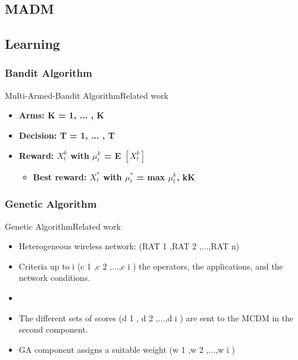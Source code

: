 \subsection{MADM}




\subsection{Learning}

\subsubsection{Bandit Algorithm}

\begin{frame}{Multi-Armed-Bandit Algorithm}{Related work}
\begin{itemize}
	\item \bf{Arms:} K = {1, ... , K}
	\item \bf{Decision:} T = {1, ... , T}
	\item \bf{Reward:} $X^{k}_{t}$ with $\mu^{k}_{t}$ = E $[X^{k}_{t}]$
	\begin{itemize}
		\item \bf{Best reward:} $X^{*}_{t}$ with $\mu^{*}_{t}$ = max $\mu^{k}_{t}$,  k\in  K
	\end{itemize}
\end{itemize}
\end{frame}

\subsubsection{Genetic Algorithm}

\begin{frame}{Genetic Algorithm}{Related work \cite{alkhawlani_access_2008a}}
\begin{itemize}
	\item Heterogeneous wireless network: (RAT 1 ,RAT 2 ,...,RAT n)
	\item Criteria up to i (c 1 ,c 2 ,...,c i ) the operators, the applications, and the network conditions.
	\item 
	\item The different sets of scores (d 1 , d 2 ,...,d i ) are sent to the MCDM in the second component.
	\item GA component assigns a suitable weight (w 1 ,w 2 ,...,w i )
\end{itemize}
\end{frame}

